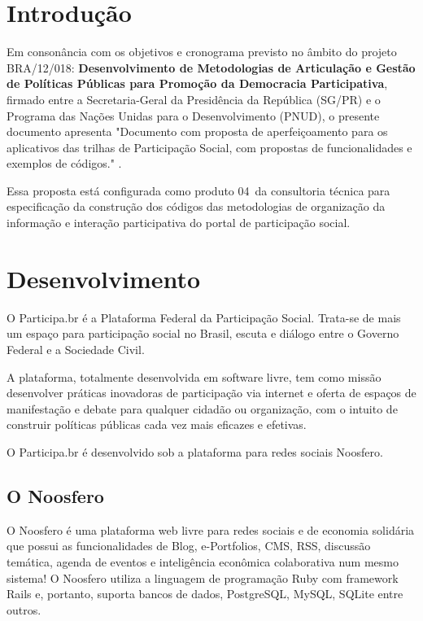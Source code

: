 \documentclass[12pt]{article}
\newcommand{\ProductNumber}{04}
\newcommand{\ProductDescription}{"Documento com proposta de aperfeiçoamento
  para os aplicativos das trilhas de Participação Social, com propostas de
  funcionalidades e exemplos de códigos."
}
\newcommand{\PalavrasChave}{palavra1, palavra2, palavra3, etc}
\begin{document}



\tableofcontents
\newpage

\begin{abstract}
escrever resumo aqui... \\

{\bf Palavras-chave:} \PalavrasChave.
\end{abstract}
\newpage

\section{Introdução}

Em consonância com os objetivos e cronograma previsto no âmbito do
projeto BRA/12/018:
\textbf{Desenvolvimento de Metodologias de Articulação e Gestão de
Políticas Públicas para Promoção da Democracia Participativa},
firmado entre a Secretaria-Geral da Presidência da República
(SG/PR) e o Programa das Nações Unidas para o Desenvolvimento (PNUD),
o presente documento apresenta \ProductDescription.

Essa proposta está configurada como produto \ProductNumber~da consultoria técnica
para especificação da construção dos códigos das metodologias de
organização da informação e interação participativa do portal de
participação social.

\section{Desenvolvimento}

O Participa.br é a Plataforma Federal da Participação Social. Trata-se de mais
um espaço para participação social no Brasil, escuta e diálogo entre o Governo
Federal e a Sociedade Civil. 

A plataforma, totalmente desenvolvida em software livre, tem como missão
desenvolver práticas inovadoras de participação via internet e oferta de
espaços de manifestação e debate para qualquer cidadão ou organização, com o
intuito de construir políticas públicas cada vez mais eficazes e efetivas.

O Participa.br é desenvolvido sob a plataforma para redes sociais Noosfero.

\subsection{O Noosfero}

O Noosfero é uma plataforma web livre para redes sociais e de economia
solidária que possui as funcionalidades de Blog, e-Portfolios, CMS, RSS,
discussão temática, agenda de eventos e inteligência econômica colaborativa
num mesmo sistema! O Noosfero utiliza a linguagem de programação Ruby com
framework Rails e, portanto, suporta bancos de dados, PostgreSQL, MySQL,
SQLite entre outros.
\end{document}
